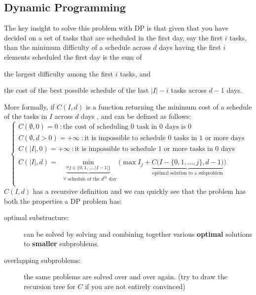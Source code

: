 \subsection{Dynamic Programming}
The key insight to solve this problem with DP is that given that you have decided on a set of tasks
that are scheduled in the first day, say the first $i$ tasks, than the minimum difficulty of a
schedule across $d$ days having the first $i$ elements scheduled the first day is the sum of 
\begin{enumerate*}
    \item  the largest difficulty  among the first $i$ tasks, and
    \item  the cost of the best possible schedule of the last $|I|- i$ tasks across $d-1$ days.
\end{enumerate*}
 More formally, if $C(I,d)$ is a function returning the minimum cost of a schedule of the tasks in
$I$ across $d$ days , and can be defined as follows:
\begin{equation}
    \begin{cases}
        C(\emptyset, 0) = 0 \; :  \text{the cost of scheduling $0$ task in $0$ days is $0$}\\
        C(\emptyset, d > 0) = +\infty \; : \text{it is impossible to schedule $0$ tasks in $1$ or more days}\\
        C(|I|, 0) = +\infty \: :\text{it is impossible to schedule $1$ or more tasks  in $0$ days}\\\\
        C(|I|, d) = \underbrace{\min_{\forall j \in \{0,1,\ldots,|I-1|\}}}_{\text{ $\forall$ schedule of the $d^{th}$ day}} \Bigg( \max I_j + \underbrace{C\Big(I - \{0,1,\ldots,j\}, d-1\Big)}_{\text{optimal solution to a subproblem}}\Bigg)\\
     \end{cases}
    \label{eq:min_difficulty_job_scheduler:dpformula}
\end{equation}
$C(I,d)$ has a recursive definition and we can quickly see that the problem has both the properties
a DP problem has:
\begin{description}
    \item[optimal substructure:] can be solved by solving and combining together various
    \textbf{optimal} solutions to \textbf{smaller} subproblems.
    \item[overlapping subproblems:] the same problems are solved over and over again. (try to draw
    the recursion tree for $C$ if you are not entirely convinced)
\end{description}

